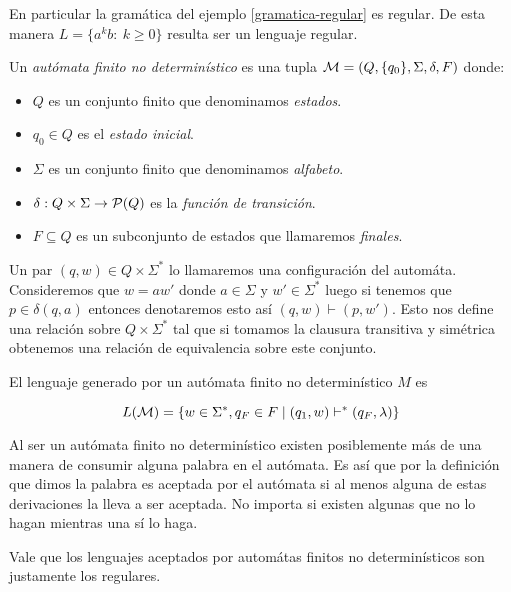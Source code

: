 \documentclass[tesis.tex]{subfiles}
\begin{document}
En particular la gramática del ejemplo \ref{gramatica-regular} es regular. 
De esta manera $L= \{ a^k b : \ k \ge 0  \}$ resulta ser un lenguaje regular.


\begin{deff}
	Un \emph{autómata finito no determinístico} es una tupla ${\cal M} = (Q,\{q_0\},\Sigma,\delta,F)$ donde:
	\begin{itemize}
		\item $Q$ es un conjunto finito que denominamos \emph{estados}.
		\item $q_0 \in Q$ es el \emph{estado inicial}.
		\item $\Sigma$ es un conjunto finito que denominamos \emph{alfabeto}.
		\item $\delta:Q \times \Sigma \to {\cal P}(Q)$ es la \emph{función de transición}.
		\item $F \subseteq Q$ es un subconjunto de estados que llamaremos \emph{finales}.
	\end{itemize}
\end{deff}

Un par $(q,w) \in Q \times \Sigma^*$ lo llamaremos una configuración del automáta.
Consideremos que $w = aw'$ donde $a \in \Sigma$ y $w' \in \Sigma^*$ luego si tenemos que $p \in \delta(q,a) $ entonces denotaremos esto así $(q,w) \vdash (p,w')$.
Esto nos define una relación sobre $Q \times \Sigma^*$ tal que si tomamos la clausura transitiva y simétrica obtenemos una relación de equivalencia sobre este conjunto.


\begin{deff}
	El lenguaje generado por un autómata finito no determinístico $M$ es
	
	\[
	L({\cal M} ) = \{  w \in \Sigma^*, q_F \in F \mid (q_1,w) \vdash^* (q_F,\lambda)     \}
	\]
	
	
\end{deff}

\begin{obs}
	Al ser un autómata finito no determinístico existen posiblemente más de una manera de consumir alguna palabra en el autómata. 
	Es así que por la definición que dimos la palabra es aceptada por el autómata si al menos alguna de estas derivaciones la lleva a ser aceptada.
	No importa si existen algunas que no lo hagan mientras una sí lo haga. 
\end{obs}

Vale que los lenguajes aceptados por automátas finitos no determinísticos son justamente los regulares.
\end{document}
